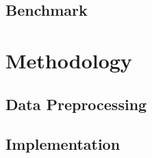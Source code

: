 \documentclass[12pt,a4paper]{article}
\begin{document}
\subsection*{Benchmark}
%
%
\section{Methodology}
%
\subsection*{Data Preprocessing}
%
\subsection*{Implementation}
%
\end{document}

